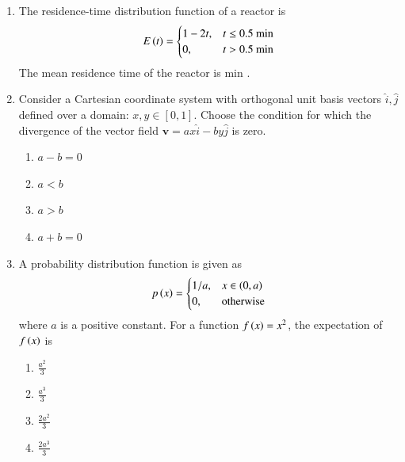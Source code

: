 \documentclass[journal,12pt,onecolumn]{IEEEtran}
\theoremstyle{remark}
\begin{document}
\begin{enumerate}
		\hfill{}
		
		\item The residence-time distribution  function of a reactor  is
		\[ E\left(t\right) = \begin{cases} 1 - 2t, & t \le 0.5 \text{ min} \\ 0, & t > 0.5 \text{ min} \end{cases} \]
		The mean residence time of the reactor is \underline{\hspace{2cm}} min .
		
		\hfill{}
		
		\item Consider a Cartesian coordinate system with orthogonal unit basis vectors $\hat{i}, \hat{j}$ defined over a domain: $x, y \in [0,1]$. Choose the condition for which the divergence of the vector field $\mathbf{v} = ax\hat{i} - by\hat{j}$ is zero.
		
		\hfill{}
		
		\begin{enumerate}
			\item $a - b = 0$
			\item $a < b$
			\item $a > b$
			\item $a + b = 0$
		\end{enumerate}
		
		\item A probability distribution function is given as
		\[ p\left(x\right) = \begin{cases} 1/a, & x \in \left(0, a\right) \\ 0, & \text{otherwise} \end{cases} \]
		where $a$ is a positive constant. For a function $f\left(x\right) = x^2$, the expectation of $f\left(x\right)$ is
		
		\hfill{}
		
		\begin{multicols}{2}
			\begin{enumerate}
				\item $\frac{a^2}{3}$
				\item $\frac{a^3}{3}$
				\item $\frac{2a^2}{3}$
				\item $\frac{2a^3}{3}$
			\end{enumerate}
		\end{multicols}
		

\end{enumerate}
\end{document}
